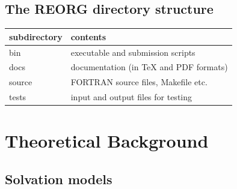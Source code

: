 \documentclass[oneside,11pt,openany]{book}
\newcommand{\tw}{\ttfamily}
\begin{document}
\section{The REORG directory structure}
\begin{tabular}{ll}
subdirectory & contents \\ \hline
{\tw bin}       & executable and submission scripts \\
{\tw docs}      & documentation (in TeX and PDF formats) \\
{\tw source}    & FORTRAN source files, {\tw Makefile} etc. \\
{\tw tests}     & input and output files for testing \\
\end{tabular}

\chapter{Theoretical Background}

\section{Solvation models}
\end{document}
